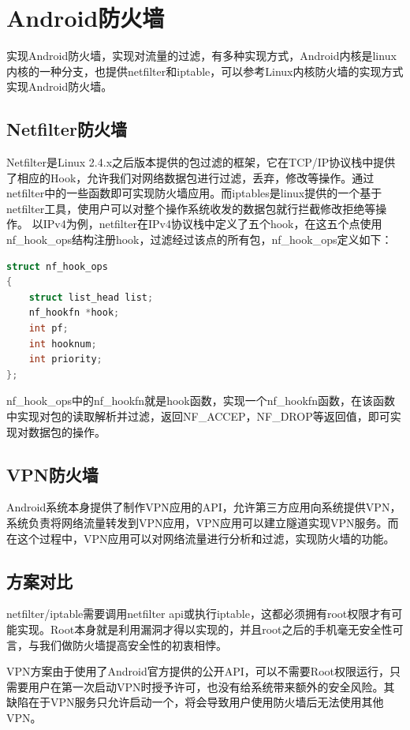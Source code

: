 \documentclass[format=final, language=chinese, degree=fyp]{hustthesis}
\begin{document}
\section{Android防火墙}
实现Android防火墙，实现对流量的过滤，有多种实现方式，Android内核是linux内核的一种分支，也提供netfilter和iptable，可以参考Linux内核防火墙的实现方式实现Android防火墙。

\subsection{Netfilter防火墙}

Netfilter是Linux 2.4.x之后版本提供的包过滤的框架，它在TCP/IP协议栈中提供了相应的Hook，允许我们对网络数据包进行过滤，丢弃，修改等操作。通过netfilter中的一些函数即可实现防火墙应用。而iptables是linux提供的一个基于netfilter工具，使用户可以对整个操作系统收发的数据包就行拦截修改拒绝等操作。
以IPv4为例，netfilter在IPv4协议栈中定义了五个hook，在这五个点使用nf\_hook\_ops结构注册hook，过滤经过该点的所有包，nf\_hook\_ops定义如下：

\begin{lstlisting}[language=c]
struct nf_hook_ops
{
    struct list_head list;
    nf_hookfn *hook;
    int pf;
    int hooknum;
    int priority;
};
\end{lstlisting}

nf\_hook\_ops中的nf\_hookfn就是hook函数，实现一个nf\_hookfn函数，在该函数中实现对包的读取解析并过滤，返回NF\_ACCEP，NF\_DROP等返回值，即可实现对数据包的操作。

\subsection{VPN防火墙}

Android系统本身提供了制作VPN应用的API，允许第三方应用向系统提供VPN，系统负责将网络流量转发到VPN应用，VPN应用可以建立隧道实现VPN服务。而在这个过程中，VPN应用可以对网络流量进行分析和过滤，实现防火墙的功能。

\subsection{方案对比}
netfilter/iptable需要调用netfilter api或执行iptable，这都必须拥有root权限才有可能实现。Root本身就是利用漏洞才得以实现的，并且root之后的手机毫无安全性可言，与我们做防火墙提高安全性的初衷相悖。

VPN方案由于使用了Android官方提供的公开API，可以不需要Root权限运行，只需要用户在第一次启动VPN时授予许可，也没有给系统带来额外的安全风险。其缺陷在于VPN服务只允许启动一个，将会导致用户使用防火墙后无法使用其他VPN。
\end{document}
